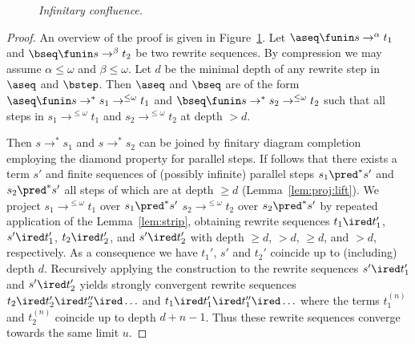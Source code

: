 \begin{figure}[hpt!]
\begin{center}
\end{center}\vspace{-3ex}
\caption{\textit{Infinitary confluence.}}
\label{fig:confluence}
\end{figure}

\begin{proof}
  An overview of the proof is given in Figure~\ref{fig:confluence}.
  Let $\aseq \funin s \to^\alpha t_1$ and $\bseq \funin s \to^\beta t_2$ be two rewrite sequences.
  By compression we may assume $\alpha \le \omega$ and $\beta \le \omega$.
  Let $d$ be the minimal depth of any rewrite step in $\aseq$ and $\bstep$.
  Then $\aseq$ and $\bseq$ are of the form
  $\aseq \funin s \to^* s_1 \to^{\le\omega} t_1$
  and
  $\bseq \funin s \to^* s_2 \to^{\le\omega} t_2$
  such that all steps in $s_1 \to^{\le\omega} t_1$ and $s_2 \to^{\le\omega} t_2$ at depth $> d$.
  
  Then $s \to^* s_1$ and $s \to^* s_2$ can be joined by finitary diagram completion employing the diamond property for parallel steps.
  If follows that there exists a term $s'$ and finite sequences of (possibly infinite) parallel steps $s_1 \pred^* s'$ and $s_2 \pred^* s'$
  all steps of which are at depth $\ge d$ (Lemma~\ref{lem:proj:lift}).
  We project 
  $s_1 \to^{\le\omega} t_1$ over $s_1 \pred^* s'$ 
  $s_2 \to^{\le\omega} t_2$ over $s_2 \pred^* s'$ 
  by repeated application of the Lemma~\ref{lem:strip},
  obtaining rewrite sequences 
  $t_1 \ired t_1'$,
  $s' \ired t_1'$,
  $t_2 \ired t_2'$, and
  $s' \ired t_2'$ with depth $\ge d$, $> d$, $\ge d$, and $> d$, respectively.
  As a consequence we have $t_1'$, $s'$ and $t_2'$ coincide up to (including) depth $d$.
  Recursively applying the construction to the rewrite sequences $s' \ired t_1'$ and $s' \ired t_2'$
  yields strongly convergent rewrite sequences 
  $t_2 \ired t_2' \ired t_2'' \ired \ldots$ and $t_1 \ired t_1' \ired t_1'' \ired \ldots$
  where the terms $t_1^{(n)}$ and $t_2^{(n)}$ coincide up to depth $d + n -1$.
  Thus these rewrite sequences converge towards the same limit $u$.
\end{proof}

